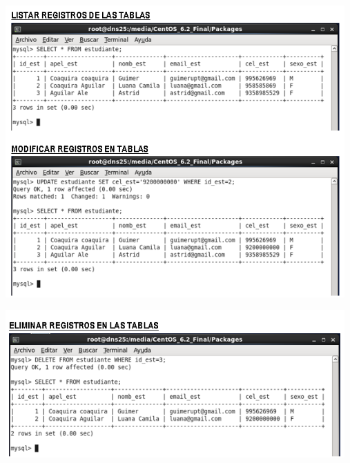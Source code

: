 \begin{itemize}
	\begin{center}
		\includegraphics[width=13cm]{./Imagenes/16a}
		\end{center}
\end{itemize} 

\begin{itemize}
	\begin{center}
		\includegraphics[width=13cm]{./Imagenes/17a}
		\end{center}
\end{itemize} 

